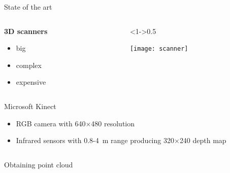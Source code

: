 \documentclass[red]{beamer}
\newcommand{\vlnovka}{\raise.35ex\hbox{$\scriptstyle\mathtt{\sim}$}}
\begin{document}
\begin{frame}{State of the art}

\begin{columns}
\begin{column}{0.5\textwidth}
\textbf{3D scanners}
\begin{itemize}
\item<2-> big
\item<3-> complex
\item<4-> expensive
\end{itemize}
\bigskip
{}
\end{column}

\begin{column}<1->{0.5\textwidth}
\centerline{\texttt{[image: scanner]}}
\end{column}

\end{columns}
\end{frame}



\begin{frame}{Microsoft Kinect}

\odrazka[2]{Price only \vlnovka\EUR{120}}
\medskip
{}
\begin{itemize}
\item<4-> RGB camera with 640$\times$480 resolution
\item<5-> Infrared sensors with 0.8-4~m range producing 320$\times$240 depth map
\end{itemize}

\begin{columns}
\begin{column}{.5\textwidth}
\end{column}
\begin{column}{.5\textwidth}
\flushright
{}
\end{column}
\end{columns}

\end{frame}



\begin{frame}{Obtaining point cloud}
\medskip
\centerline{
}
\end{frame}
\end{document}
